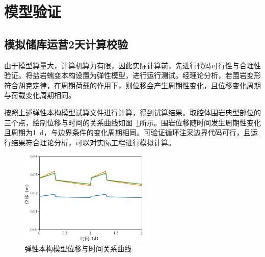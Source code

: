 \section{模型验证}
\subsection{模拟储库运营2天计算校验}

由于模型算量大，计算机算力有限，因此实际计算前，先进行代码可行性与合理性验证。将盐岩蠕变本构设置为弹性模型，进行运行测试。经理论分析，若围岩变形符合胡克定律，在周期荷载的作用下，则位移会产生周期性变化，且位移变化周期与荷载变化周期相同。




按照上述弹性本构模型试算文件进行计算，得到试算结果。取腔体围岩典型部位的三个点，绘制位移与时间的关系曲线如图~\ref{fig:E}所示。围岩位移随时间发生周期性变化且周期为\SI{1}{d}，与边界条件的变化周期相同。可验证循环注采边界代码可行，且运行结果符合理论分析，可以对实际工程进行模拟计算。
\begin{figure}[ht!]
    \centering
    \includegraphics[width=0.55\textwidth]{img/chap5/弹性本构测试结果.pdf}
    \caption{弹性本构模型位移与时间关系曲线}
    \label{fig:E}
\end{figure}

